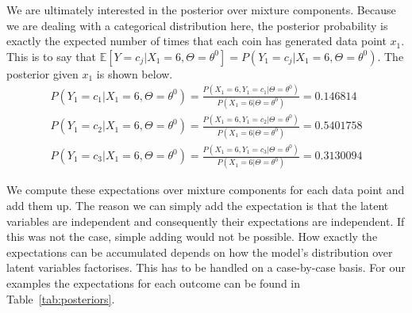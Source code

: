 \documentclass[a4paper,11pt,leqno]{report}\usepackage[]{graphicx}\usepackage[]{color}
\newcommand{\E}{\mathbb{E}}
\begin{document}
We are ultimately interested in the posterior over mixture components. Because we are dealing with a categorical
distribution here, the posterior probability is exactly the expected
number of times that each coin has generated data point $ x_{1} $. This is to say that
$\E[Y=c_{j}|X_{1}=6, \Theta = \theta^{0}] = P(Y_{1}=c_{j}|X_{1}=6, \Theta=\theta^{0}) $. The
posterior given $ x_{1} $ is shown below.
\begin{align}\label{eq:posterior}
P(Y_{1} = c_{1}|X_{1}=6,\Theta= \theta^{0}) = \frac{P(X_{1}=6,Y_{1} = c_{1}|\Theta= \theta^{0})}{P(X_1 = 6|\Theta= \theta^{0})} = 0.146814 \\
P(Y_{1} = c_{2}|X_{1}=6,\Theta= \theta^{0}) = \frac{P(X_{1}=6,Y_{1} = c_{2}|\Theta= \theta^{0})}{P(X_1 = 6|\Theta= \theta^{0})} = 0.5401758 \nonumber \\
P(Y_{1} = c_{3}|X_{1}=6,\Theta= \theta^{0}) = \frac{P(X_{1}=6,Y_{1} = c_{3}|\Theta= \theta^{0})}{P(X_1 = 6|\Theta= \theta^{0})} = 0.3130094 \nonumber
\end{align}

We compute these expectations over mixture components for each data point and add them up. The reason we can simply add the expectation is that
the latent variables are independent and consequently their expectations are independent. If this was not the case, simple adding would not
be possible. How exactly the expectations can be accumulated depends on how the model's distribution over latent variables factorises. This has to
be handled on a case-by-case basis. For our examples the expectations for each outcome can be found in Table~\ref{tab:posteriors}.
\end{document}
